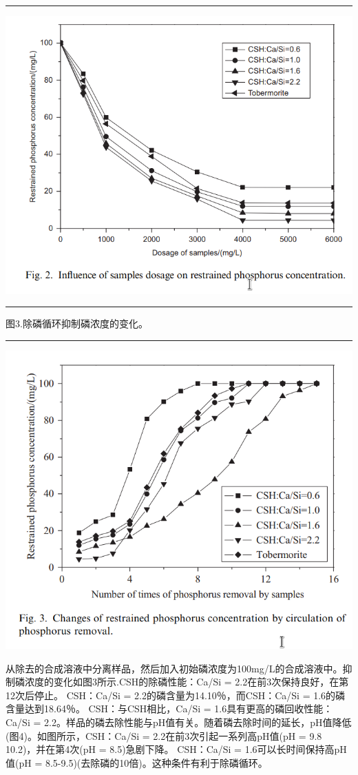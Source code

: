 \documentclass[11pt]{article}
\begin{document}
\noindent\rule{\textwidth}{0.5pt}
\includegraphics[scale=0.3]{fig.2.png}

\noindent\rule{\textwidth}{0.5pt}
图3.除磷循环抑制磷浓度的变化。

\noindent\rule{\textwidth}{0.5pt}
\includegraphics[scale=0.5]{fig.3.png}

从除去的合成溶液中分离样品，然后加入初始磷浓度为100mg/L的合成溶液中。抑制磷浓度的变化如图3所示.CSH的除磷性能：Ca/Si = 2.2在前3次保持良好，在第12次后停止。 CSH：Ca/Si = 2.2的磷含量为14.10％，而CSH：Ca/Si = 1.6的磷含量达到18.64％。 CSH：与CSH相比，Ca/Si = 1.6具有更高的磷回收性能：Ca/Si = 2.2。样品的磷去除性能与pH值有关。随着磷去除时间的延长，pH值降低(图4)。如图所示，CSH：Ca/Si = 2.2在前3次引起一系列高pH值(pH = 9.8 10.2)，并在第4次(pH = 8.5)急剧下降。 CSH：Ca/Si = 1.6可以长时间保持高pH值(pH = 8.5-9.5)(去除磷的10倍)。这种条件有利于除磷循环。
\end{document}
